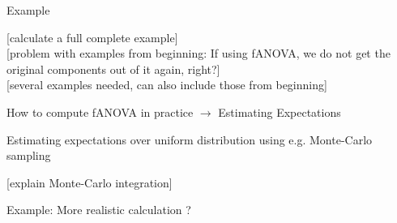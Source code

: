 \documentclass[11pt,compress,t,notes=noshow, aspectratio=169, xcolor=table]{beamer}
\begin{document}
\begin{frame}{Example}

    [calculate a full complete example] \\
    
    [problem with examples from beginning: If using fANOVA, we do not get the original components out of it again, right?]\\

    [several examples needed, can also include those from beginning]
    
\end{frame}

\begin{frame}{How to compute fANOVA in practice $\rightarrow$ Estimating Expectations}

    Estimating expectations over uniform distribution using e.g. Monte-Carlo sampling

    [explain Monte-Carlo integration]
    
\end{frame}

\begin{frame}{Example: More realistic calculation ?}
    
\end{frame}
\end{document}
